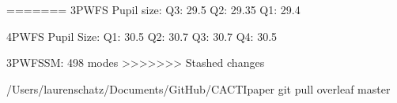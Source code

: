





=======
3PWFS Pupil size:
Q3: 29.5
Q2: 29.35
Q1: 29.4

4PWFS Pupil Size:
Q1: 30.5
Q2: 30.7
Q3: 30.7
Q4: 30.5

3PWFSSM: 498 modes
>>>>>>> Stashed changes

/Users/laurenschatz/Documents/GitHub/CACTIpaper
git pull overleaf master

